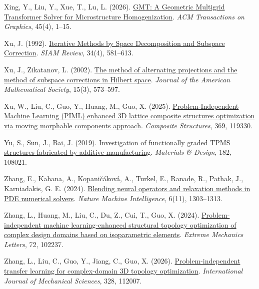 \documentclass[preprint,12pt,authoryear]{elsarticle}
\begin{document}
Xing, Y., Liu, Y., Xue, T., Lu, L. (2026). \href{https://doi.org/10.1145/3811333}{GMT: A Geometric Multigrid Transformer Solver for Microstructure Homogenization}. \emph{ACM Transactions on Graphics}, 45(4), 1--15.

Xu, J. (1992). \href{https://doi.org/10.1137/1034116}{Iterative Methods by Space Decomposition and Subspace Correction}. \emph{SIAM Review}, 34(4), 581--613.

Xu, J., Zikatanov, L. (2002). \href{https://doi.org/10.1090/S0894-0347-02-00398-3}{The method of alternating projections and the method of subspace corrections in Hilbert space}. \emph{Journal of the American Mathematical Society}, 15(3), 573--597.

Xu, W., Liu, C., Guo, Y., Huang, M., Guo, X. (2025). \href{https://doi.org/10.1016/j.compstruct.2025.119330}{Problem-Independent Machine Learning (PIML) enhanced 3D lattice composite structures optimization via moving morphable components approach}. \emph{Composite Structures}, 369, 119330.

Yu, S., Sun, J., Bai, J. (2019). \href{https://doi.org/10.1016/j.matdes.2019.108021}{Investigation of functionally graded TPMS structures fabricated by additive manufacturing}. \emph{Materials \& Design}, 182, 108021.

Zhang, E., Kahana, A., Kopaničáková, A., Turkel, E., Ranade, R., Pathak, J., Karniadakis, G. E. (2024). \href{https://doi.org/10.1038/s42256-024-00910-x}{Blending neural operators and relaxation methods in PDE numerical solvers}. \emph{Nature Machine Intelligence}, 6(11), 1303--1313.

Zhang, L., Huang, M., Liu, C., Du, Z., Cui, T., Guo, X. (2024). \href{https://doi.org/10.1016/j.eml.2024.102237}{Problem-independent machine learning-enhanced structural topology optimization of complex design domains based on isoparametric elements}. \emph{Extreme Mechanics Letters}, 72, 102237.

Zhang, L., Liu, C., Guo, Y., Jiang, C., Guo, X. (2026). \href{https://doi.org/10.1016/j.ijmecsci.2026.112007}{Problem-independent transfer learning for complex-domain 3D topology optimization}. \emph{International Journal of Mechanical Sciences}, 328, 112007.

\endgroup
\end{document}
